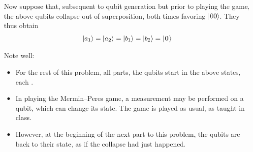 \documentclass[12pt]{article}
\begin{document}
\begin{enumerate}
Now suppose that, subsequent to qubit generation but prior to playing the game, the above qubits collapse out of superposition, both times favoring $\ket{00}$.  They thus obtain  \[
\ket{a_1}=\ket{a_2}=\ket{b_1}=\ket{b_2}=\QZero{}
\]

Note well:
\begin{itemize}
\item For the rest of this problem, all parts, the qubits start in the above states, each \QZero{}.
\item In playing the Mermin--Peres game, a measurement may be performed on a qubit, which can change its state.  The game is played as usual, as taught in class.
\item However, at the beginning of the next part to this problem, the qubits are back to their \QZero{} state, as if the collapse had just happened.
\end{itemize}


\end{enumerate}
\end{document}
